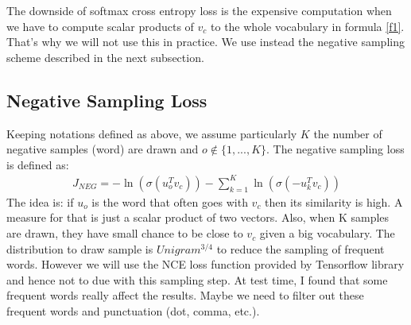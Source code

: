 \documentclass[12pt,oneside,a4paper]{book}
\theoremstyle{break}
\begin{document}
The downside of softmax cross entropy loss is the expensive computation when we have to compute scalar products of $v_c$ to the whole vocabulary in formula \ref{f1}. That's why we will not use this in practice. We use instead the negative sampling scheme described in the next subsection.
\subsection{Negative Sampling Loss}
Keeping notations defined as above, we assume particularly $K$ the number of negative samples (word) are drawn and $o \notin \{1,...,K\}$. The negative sampling loss is defined as:
\begin{align}
J_{NEG} = -\ln(\sigma(u_o^T v_c)) - \sum_{k=1}^K \ln(\sigma(-u_k^T v_c))
\end{align}
The idea is: if $u_o$ is the word that often goes with $v_c$ then its similarity is high. A measure for that is just a scalar product of two vectors. Also, when K samples are drawn, they have small chance to be close to $v_c$ given a big vocabulary. The distribution to draw sample is $Unigram^{3/4}$ to reduce the sampling of frequent words. However we will use the NCE loss function provided by Tensorflow library and hence not to due with this sampling step. At test time, I found that some frequent words really affect the results. Maybe we need to filter out these frequent words and punctuation (dot, comma, etc.).

% 

% 

% 

\end{document}
